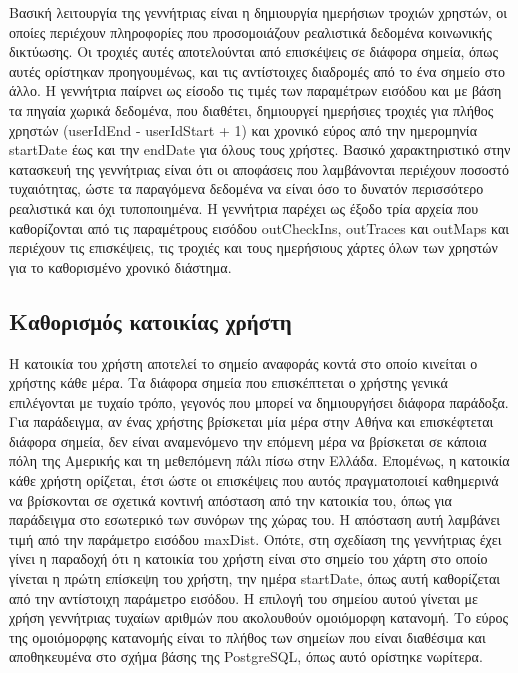 Βασική λειτουργία της γεννήτριας είναι η δημιουργία ημερήσιων τροχιών χρηστών, οι οποίες περιέχουν πληροφορίες που προσομοιάζουν ρεαλιστικά δεδομένα 
κοινωνικής δικτύωσης. Οι \linebreak τροχιές αυτές αποτελούνται από επισκέψεις σε διάφορα σημεία, όπως αυτές ορίστηκαν \linebreak προηγουμένως,  
και τις αντίστοιχες διαδρομές από το ένα σημείο στο άλλο. Η γεννήτρια παίρνει ως είσοδο τις τιμές των παραμέτρων εισόδου και με βάση τα πηγαία 
χωρικά δεδομένα, που διαθέτει, 
δημιουργεί ημερήσιες τροχιές για πλήθος χρηστών (userIdEnd - userIdStart + 1) και χρονικό εύρος από την ημερομηνία startDate έως και την endDate 
για όλους τους χρήστες. Βασικό χαρακτηριστικό στην κατασκευή της γεννήτριας είναι ότι οι αποφάσεις που λαμβάνονται περιέχουν ποσοστό τυχαιότητας, ώστε 
τα παραγόμενα δεδομένα να είναι όσο το δυνατόν \linebreak περισσότερο ρεαλιστικά και όχι τυποποιημένα. 
Η γεννήτρια παρέχει ως έξοδο τρία αρχεία που καθορίζονται από τις παραμέτρους εισόδου outCheckIns, outTraces και outMaps και περιέχουν 
τις επισκέψεις, τις τροχιές και τους ημερήσιους χάρτες όλων των χρηστών για το καθορισμένο χρονικό διάστημα. 

\subsection{Καθορισμός κατοικίας χρήστη}

Η κατοικία του χρήστη αποτελεί το σημείο αναφοράς κοντά στο οποίο κινείται ο χρήστης κάθε μέρα. Τα διάφορα σημεία που επισκέπτεται 
ο χρήστης γενικά επιλέγονται με τυχαίο τρόπο, γεγονός που μπορεί να δημιουργήσει διάφορα παράδοξα. Για παράδειγμα, αν ένας χρήστης 
βρίσκεται μία μέρα στην Αθήνα και επισκέφτεται διάφορα σημεία, δεν είναι αναμενόμενο την επόμενη μέρα να βρίσκεται σε κάποια πόλη της Αμερικής και τη μεθεπόμενη πάλι πίσω 
στην Ελλάδα. Επομένως, η κατοικία κάθε χρήστη ορίζεται, έτσι ώστε οι επισκέψεις που αυτός \linebreak πραγματοποιεί καθημερινά να βρίσκονται σε σχετικά κοντινή απόσταση 
από την κατοικία του, όπως για παράδειγμα στο εσωτερικό των συνόρων της χώρας του. Η απόσταση αυτή λαμβάνει τιμή από την παράμετρο εισόδου maxDist. 
Οπότε, στη σχεδίαση της γεννήτριας έχει γίνει η παραδοχή ότι η κατοικία του χρήστη είναι στο σημείο του χάρτη στο οποίο γίνεται η πρώτη επίσκεψη του 
χρήστη, την ημέρα startDate, όπως αυτή καθορίζεται από την αντίστοιχη παράμετρο εισόδου. Η επιλογή του σημείου αυτού γίνεται με χρήση γεννήτριας τυχαίων αριθμών 
που ακολουθούν ομοιόμορφη κατανομή. Το εύρος της ομοιόμορφης κατανομής είναι το πλήθος των σημείων που είναι διαθέσιμα και αποθηκευμένα στο σχήμα βάσης 
της PostgreSQL, όπως αυτό ορίστηκε νωρίτερα.

